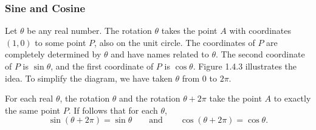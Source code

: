 \documentclass[11pt]{book}
\theoremstyle{break}
\theoremstyle{no_label}
\numberwithin{equation}{section}
\begin{document}
\subsubsection*{Sine and Cosine}

Let $\theta$ be any real number. The rotation $\theta$ takes the point $A$ with coordinates $(1, 0)$ to some point $P$, also on the unit circle. The coordinates of $P$ are completely determined by $\theta$ and have names related to $\theta$. The second coordinate of $P$ is $\sin\theta$, and the first coordinate of $P$ is $\cos\theta$. Figure 1.4.3 illustrates the idea. To simplify the diagram, we have taken $\theta$ from $0$ to $2\pi$.

For each real $\theta$, the rotation $\theta$ and the rotation $\theta+2\pi$ take the point $A$ to exactly the same point $P$. If follows that for each $\theta$, $$\sin(\theta+2\pi)=\sin\theta\qquad\text{and}\qquad\cos(\theta+2\pi)=\cos\theta.$$
\end{document}
